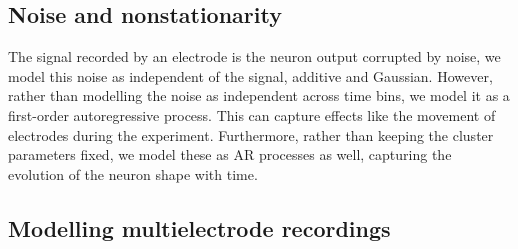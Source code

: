 \subsection{Noise and nonstationarity}
The signal recorded by an electrode is the neuron output corrupted by noise, we model this noise as independent of the signal, additive and Gaussian.
However, rather than modelling the noise as independent across time bins, we model it as a first-order autoregressive process. This can capture
effects like the movement of electrodes during the experiment. Furthermore, rather than keeping the cluster parameters fixed, we model these as
AR processes as well, capturing the evolution of the neuron shape with time.

\subsection{Modelling multielectrode recordings}
